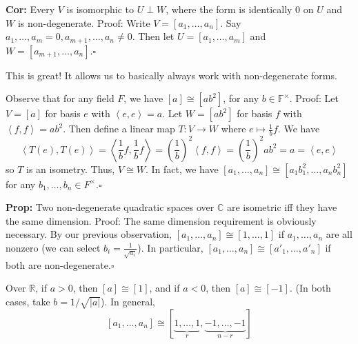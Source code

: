 \documentclass[10pt,letterpaper]{article}
\newcommand{\n}{\hfill\break}
\newcommand{\hangblock}[2]{\par\noindent\settowidth{\hangindent}{\textbf{#1: }}\textbf{#1: }\!\!\!#2}
\newcommand{\cor}[1]{\hangblock{Cor}{#1}}
\newcommand{\prop}[1]{\hangblock{Prop}{#1}}
\newcommand{\proven}{\;$\square$\n}
\newcommand{\reals}{\mathbb{R}}
\newcommand{\R}{\reals}
\newcommand{\complex}{\mathbb{C}}
\newcommand{\C}{\complex}
\newcommand{\abs}[1]{\left|#1\right|}
\newcommand{\iprod}[1]{\left<#1\right>}
\newcommand{\F}{\mathbb{F}}
\newcommand{\paren}[1]{\left(#1\right)}
\begin{document}
\cor{
	Every $V$ is isomorphic to $U\perp{}W$, where the form is identically $0$ on $U$ and $W$ is non-degenerate.\n
	Proof: Write $V=[a_{1},\ldots,a_{n}]$. Say $a_{1},\ldots,a_{m}=0,a_{m+1},\ldots,a_{n}\ne{}0$. Then let $U=[a_{1},\ldots,a_{m}]$ and $W=[a_{m+1},\ldots,a_{n}]$.\proven
}

\par\noindent
This is great! It allows us to basically always work with non-degenerate forms.\n

\par\noindent
Observe that for any field $F$, we have $[a]\cong[ab^{2}]$, for any $b\in\F^{\times}$.\n
Proof: Let $V=[a]$ for basis $e$ with $\iprod{e,e}=a$. Let $W=[ab^{2}]$ for basis $f$ with $\iprod{f,f}=ab^{2}$. Then define a linear map $T:V\to{}W$ where $e\mapsto\frac{1}{b}f$. We have
\[
	\iprod{T(e),T(e)}=\iprod{\frac{1}{b}f,\frac{1}{b}f}=\paren{\frac{1}{b}}^{2}\iprod{f,f}=\paren{\frac{1}{b}}^{2}ab^{2}=a=\iprod{e,e}
\]
so $T$ is an isometry. Thus, $V\cong{}W$. In fact, we have $[a_{1},\ldots,a_{n}]\cong[a_{1}b_{1}^{2},\ldots,a_{n}b_{n}^{2}]$ for any $b_{1},\ldots,b_{n}\in{}F^{\times}$.\proven

\prop{
	Two non-degenerate quadratic spaces over $\C$ are isometric iff they have the same dimension.\n
	Proof: The same dimension requirement is obviously necessary.\n
	By our previous observation, $[a_{1},\ldots,a_{n}]\cong[1,\ldots,1]$ if $a_{1},\ldots,a_{n}$ are all nonzero (we can select $b_{i}=\frac{1}{\sqrt{a_{i}}}$). In particular, $[a_{1},\ldots,a_{n}]\cong[a'_{1},\ldots,a'_{n}]$ if both are non-degenerate.\proven
}

\par\noindent
Over $\R$, if $a>0$, then $[a]\cong[1]$, and if $a<0$, then $[a]\cong[-1]$. (In both cases, take $b=1/\sqrt{\abs{a}}$). In general,
\[
	[a_{1},\ldots,a_{n}]\cong[\underbrace{1,\ldots,1}_{r},\underbrace{-1,\ldots,-1}_{n-r}]
\]
\end{document}
